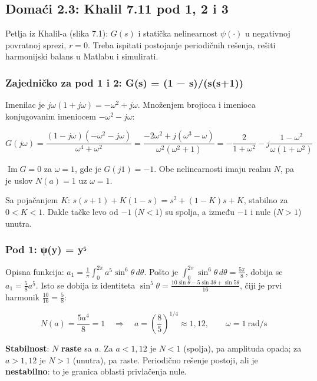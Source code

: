 \documentclass[11pt,a4paper,parskip=half,headsepline,numbers=noenddot]{scrartcl}
\begin{document}
\subsection{Domaći 2.3: Khalil 7.11 pod 1, 2 i 3}

Petlja iz Khalil-a (slika 7.1): \(G(s)\) i statička nelinearnost \(\psi(\cdot)\) u negativnoj povratnoj sprezi, \(r = 0\). Treba ispitati postojanje periodičnih rešenja, rešiti harmonijski balans u Matlabu i simulirati.

\subsubsection{Zajedničko za pod 1 i 2: G(s) = (1 − s)/(s(s+1))}

Imenilac je \(j\omega(1 + j\omega) = -\omega^2 + j\omega\). Množenjem brojioca i imenioca konjugovanim imeniocem \(-\omega^2 - j\omega\):

\[G(j\omega) = \frac{(1 - j\omega)(-\omega^2 - j\omega)}{\omega^4 + \omega^2} = \frac{-2\omega^2 + j(\omega^3 - \omega)}{\omega^2(\omega^2 + 1)} = -\frac{2}{1 + \omega^2} - j\frac{1 - \omega^2}{\omega(1 + \omega^2)}\]

\(\operatorname{Im}G = 0\) za \(\omega = 1\), gde je \(G(j1) = -1\). Obe nelinearnosti imaju realnu \(N\), pa je uslov \(N(a) = 1\) uz \(\omega = 1\).

Sa pojačanjem \(K\): \(s(s+1) + K(1 - s) = s^2 + (1 - K)s + K\), stabilno za \(0 < K < 1\). Dakle tačke levo od \(-1\) (\(N < 1\)) su spolja, a između \(-1\) i nule (\(N > 1\)) unutra.

\subsubsection{Pod 1: ψ(y) = y⁵}

Opisna funkcija: \(a_1 = \frac{1}{\pi}\int_0^{2\pi} a^5\sin^6\theta\,d\theta\). Pošto je \(\int_0^{2\pi}\sin^6\theta\,d\theta = \frac{5\pi}{8}\), dobija se \(a_1 = \frac{5}{8}a^5\). Isto se dobija iz identiteta \(\sin^5\theta = \frac{10\sin\theta - 5\sin3\theta + \sin5\theta}{16}\), čiji je prvi harmonik \(\frac{10}{16} = \frac58\):

\[N(a) = \frac{5a^4}{8} = 1 \quad\Rightarrow\quad a = \left(\frac{8}{5}\right)^{1/4} \approx 1{,}12, \qquad \omega = 1\ \text{rad/s}\]

\textbf{Stabilnost}: \(N\) \textbf{raste} sa \(a\). Za \(a < 1{,}12\) je \(N < 1\) (spolja), pa amplituda opada; za \(a > 1{,}12\) je \(N > 1\) (unutra), pa raste. Periodično rešenje postoji, ali je \textbf{nestabilno}: to je granica oblasti privlačenja nule.
\end{document}
